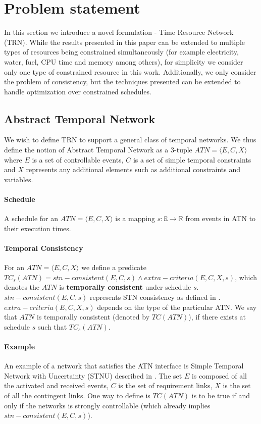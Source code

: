 \section{Problem statement}
In this section we introduce a novel formulation - Time Resource Network (TRN). While the results presented in this paper can be extended to multiple types of resources being constrained simultaneously (for example electricity, water, fuel, CPU time and memory among others), for simplicity we consider only one type of constrained resource in this work. Additionally, we only consider the problem of consistency, but the techniques presented can be extended to handle optimization over constrained schedules.

\subsection{Abstract Temporal Network}
We wish to define TRN to support a general class of temporal networks. We thus define the notion of Abstract Temporal Network as a 3-tuple $ATN=\langle E, C, X\rangle$ where $E$ is a set of controllable events, $C$ is a set of simple temporal constraints \cite{dechter1991temporal} and $X$ represents any additional elements such as additional constraints and variables.

\paragraph{Schedule}
A schedule for an $ATN= \langle E,C,X \rangle$ is a mapping $s: \texttt{E} \rightarrow \mathbb{R}$ from events in ATN to their execution times.

\paragraph{Temporal Consistency}
\label{temporal_consistency}
For an $ATN=\langle E,C,X \rangle$ we define a predicate $TC_s(ATN) = stn-consistent(E,C,s) \wedge extra-criteria(E,C,X,s)$, which denotes the $ATN$ is \textbf{temporally consistent} under schedule $s$. $stn-consistent(E,C,s)$ represents STN consistency as defined in \cite{dechter1991temporal}.  $extra-criteria(E,C,X,s)$ depends on the type of the particular ATN. We say that $ATN$ is temporally consistent (denoted by $TC(ATN)$), if there exists at schedule $s$ such that $TC_s(ATN)$.

\paragraph{Example}
An example of a network that satisfies the ATN interface is Simple Temporal Network with Uncertainty (STNU) described in \cite{vidal1996dealing}. The set $E$ is composed of all the activated and received events, $C$ is the set of requirement links, $X$ is the set of all the contingent links. One way to define is $TC(ATN)$ is to be true if and only if the networks is strongly controllable (which already implies $stn-consistent(E,C,s)$).

